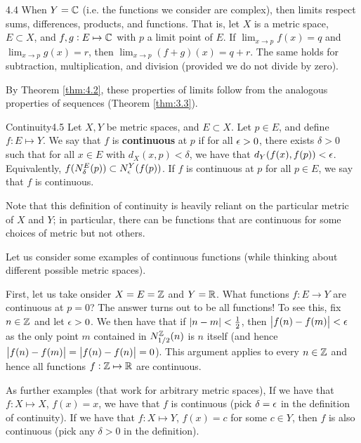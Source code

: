 
\begin{theorem}{}{4.4}
    When $Y = \mathbb{C}$ (i.e. the functions we consider are complex), then limits respect sums, differences, products, and functions. That is, let $X$ is a metric space, $E \subset X$, and $f, g: E \mapsto \mathbb{C}$ with $p$ a limit point of $E$. If $\lim_{x \rightarrow p}f(x) = q$ and $\lim_{x \rightarrow p}g(x) = r$, then $\lim_{x \rightarrow p}(f+g)(x) = q + r$. The same holds for subtraction, multiplication, and division (provided we do not divide by zero).
\end{theorem}
\begin{nproof}
    By Theorem \ref{thm:4.2}, these properties of limits follow from the analogous properties of sequences (Theorem \ref{thm:3.3}).
\end{nproof}

\begin{definition}{Continuity}{4.5}
    Let $X, Y$ be metric spaces, and $E \subset X$. Let $p \in E$, and define $f: E \mapsto Y$. We say that $f$ is \textbf{continuous} at $p$ if for all $\epsilon > 0$, there exists $\delta > 0$ such that for all $x \in E$ with $d_X(x, p) < \delta$, we have that $d_Y(f(x), f(p)) < \epsilon$. Equivalently, $f(N_\delta^E(p)) \subset N_\epsilon^Y(f(p))$. If $f$ is continuous at $p$ for all $p \in E$, we say that $f$ is continuous.
\end{definition}
\noindent Note that this definition of continuity is heavily reliant on the particular metric of $X$ and $Y$; in particular, there can be functions that are continuous for some choices of metric but not others.

Let us consider some examples of continuous functions (while thinking about different possible metric spaces). 

First, let us take onsider $X = E = \mathbb{Z}$ and $Y = \mathbb{R}$. What functions $f: E \rightarrow Y$ are continuous at $p = 0$? The answer turns out to be all functions! To see this, fix $n \in \mathbb{Z}$ and let $\epsilon > 0$. We then have that if $\abs{n - m} < \frac{1}{2}$, then $\abs{f(n) - f(m)} < \epsilon$ as the only point $m$ contained in $N_{1/2}^{\mathbb{Z}}(n)$ is $n$ itself (and hence $\abs{f(n) - f(m)} = \abs{f(n) - f(n)} = 0$). This argument applies to every $n \in \mathbb{Z}$ and hence all functions $f: \mathbb{Z} \mapsto \mathbb{R}$ are continuous.

As further examples (that work for arbitrary metric spaces), If we have that $f: X \mapsto X$, $f(x) = x$, we have that $f$ is continuous (pick $\delta = \epsilon$ in the definition of continuity). If we have that $f: X \mapsto Y$, $f(x) = c$ for some $c \in Y$, then $f$ is also continuous (pick any $\delta > 0$ in the definition). 

